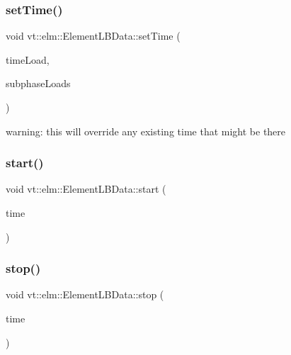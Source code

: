 \mbox{\label{structvt_1_1elm_1_1_element_l_b_data_a144c7d6efa4c672a450aa9de612f3bff}} 
\subsubsection{\texorpdfstring{set\+Time()}{setTime()}}
{\footnotesize\ttfamily void vt\+::elm\+::\+Element\+L\+B\+Data\+::set\+Time (\begin{DoxyParamCaption}\item[{\hyperlink{namespacevt_a8fb51741340b87d7aaee0bef60e9896b}{Load\+Type} const}]{time\+Load,  }\item[{std\+::vector$<$ \hyperlink{namespacevt_a8fb51741340b87d7aaee0bef60e9896b}{Load\+Type} $>$ const \&}]{subphase\+Loads }\end{DoxyParamCaption})}



warning\+: this will override any existing time that might be there 

\mbox{\label{structvt_1_1elm_1_1_element_l_b_data_a19e990ccbc5b1090e8d8385e19af760a}} 
\subsubsection{\texorpdfstring{start()}{start()}}
{\footnotesize\ttfamily void vt\+::elm\+::\+Element\+L\+B\+Data\+::start (\begin{DoxyParamCaption}\item[{\hyperlink{namespacevt_a2b9f28078dc309ad0706b69ded743e69}{Time\+Type}}]{time }\end{DoxyParamCaption})}

\mbox{\label{structvt_1_1elm_1_1_element_l_b_data_a96ccd1c4f6ec13365ca9d483eab8944c}} 
\subsubsection{\texorpdfstring{stop()}{stop()}}
{\footnotesize\ttfamily void vt\+::elm\+::\+Element\+L\+B\+Data\+::stop (\begin{DoxyParamCaption}\item[{\hyperlink{namespacevt_a2b9f28078dc309ad0706b69ded743e69}{Time\+Type}}]{time }\end{DoxyParamCaption})}

